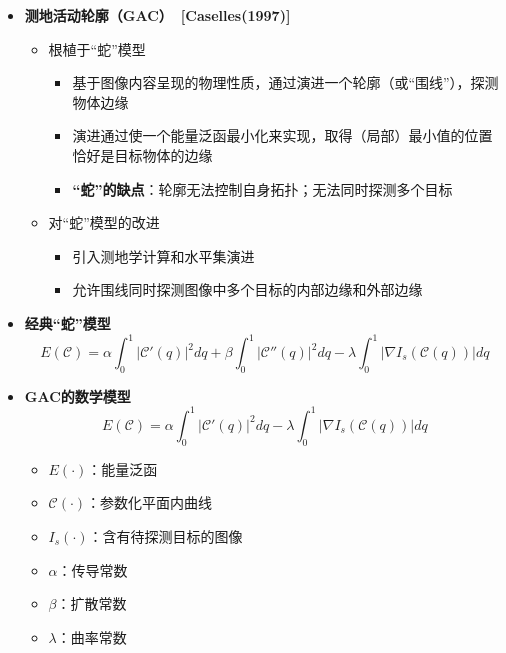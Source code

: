 \begin{frame}
\begin{itemize}
\item \textbf{测地活动轮廓（GAC）~[Caselles(1997)]}
\begin{itemize}
\pause \item 根植于“蛇”模型
\begin{itemize}
\item 基于图像内容呈现的物理性质，通过演进一个轮廓（或“围线”），探测物体边缘
\item 演进通过使一个能量泛函最小化来实现，取得（局部）最小值的位置恰好是目标物体的边缘
\item \textbf{“蛇”的缺点}：轮廓无法控制自身拓扑；无法同时探测多个目标
\end{itemize}
\pause \item 对“蛇”模型的改进
\begin{itemize}
\item 引入测地学计算和水平集演进
\item 允许围线同时探测图像中多个目标的内部边缘和外部边缘
\end{itemize}
\end{itemize}
\end{itemize}
\end{frame}

\begin{frame}
\begin{itemize}
 \item \textbf{经典“蛇”模型}
\begin{equation*}
E(\mathcal{C}) = \alpha \int_0^1 | \mathcal{C}'(q) |^2 dq + \beta \int_0^1 | \mathcal{C}''(q) |^2 dq - \lambda \int_0^1 | \nabla I_{s} ( \mathcal{C}(q) ) |dq
\end{equation*}
  \item \textbf{GAC的数学模型}
\begin{equation*}
E(\mathcal{C}) = \alpha \int_0^1 | \mathcal{C}'(q) |^2 dq - \lambda \int_0^1 | \nabla I_{s} ( \mathcal{C}(q) ) |dq
\end{equation*}
 \begin{itemize}
\item $E(\cdot)$：能量泛函
\item $\mathcal{C}(\cdot)$：参数化平面内曲线
\item $I_{s}(\cdot)$：含有待探测目标的图像
\item $\alpha$：传导常数
\item $\beta$：扩散常数
\item $\lambda$：曲率常数
\end{itemize}
\end{itemize}
\end{frame}

